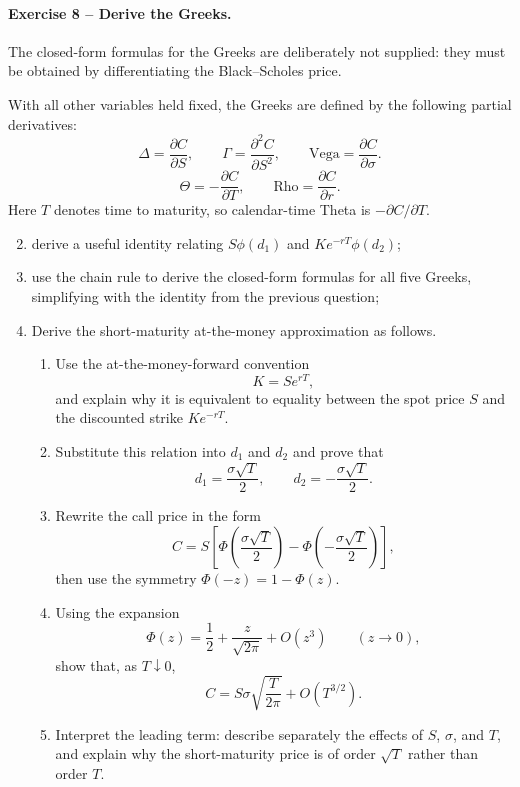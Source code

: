 \documentclass[10pt]{article}
\begin{document}
\paragraph{Exercise 8 -- Derive the Greeks.}
The closed-form formulas for the Greeks are deliberately not supplied: they
must be obtained by differentiating the Black--Scholes price.

With all other variables held fixed, the Greeks are defined by the following
partial derivatives:
\[
\boxed{
\Delta=\frac{\partial C}{\partial S},\qquad
\Gamma=\frac{\partial^2 C}{\partial S^2},\qquad
\mathrm{Vega}=\frac{\partial C}{\partial\sigma}.}
\]
\[
\boxed{
\Theta=-\frac{\partial C}{\partial T},\qquad
\mathrm{Rho}=\frac{\partial C}{\partial r}.}
\]
Here $T$ denotes time to maturity, so calendar-time Theta is
$-\partial C/\partial T$.

\begin{enumerate}
\setcounter{enumi}{1}
\item derive a useful identity relating $S\phi(d_1)$ and
$Ke^{-rT}\phi(d_2)$;
\item use the chain rule to derive the closed-form formulas for all five
Greeks, simplifying with the identity from the previous question;
\item Derive the short-maturity at-the-money approximation as follows.
\begin{enumerate}[label=(\alph*)]
\item Use the at-the-money-forward convention
\[
K=Se^{rT},
\]
and explain why it is equivalent to equality between the spot price $S$ and
the discounted strike $Ke^{-rT}$.
\item Substitute this relation into $d_1$ and $d_2$ and prove that
\[
d_1=\frac{\sigma\sqrt T}{2},
\qquad
d_2=-\frac{\sigma\sqrt T}{2}.
\]
\item Rewrite the call price in the form
\[
C=S\left[
\Phi\left(\frac{\sigma\sqrt T}{2}\right)
-\Phi\left(-\frac{\sigma\sqrt T}{2}\right)
\right],
\]
then use the symmetry $\Phi(-z)=1-\Phi(z)$.
\item Using the expansion
\[
\Phi(z)=\frac12+\frac{z}{\sqrt{2\pi}}+O(z^3)
\qquad (z\to0),
\]
show that, as $T\downarrow0$,
\[
C=S\sigma\sqrt{\frac{T}{2\pi}}+O(T^{3/2}).
\]
\item Interpret the leading term: describe separately the effects of $S$,
$\sigma$, and $T$, and explain why the short-maturity price is of order
$\sqrt T$ rather than order $T$.
\end{enumerate}
\end{enumerate}
\end{document}
